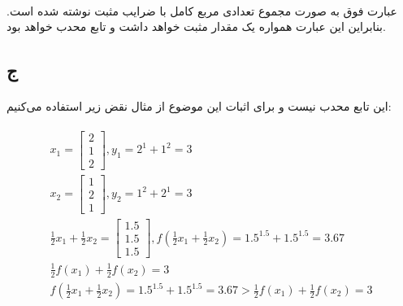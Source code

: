 \documentclass[paper=a4, fontsize=11pt]{article}
\numberwithin{equation}{section} %
\numberwithin{figure}{section} %
\numberwithin{table}{section} %
\begin{document}
\paragraph{}
عبارت فوق به صورت مجموع تعدادی مربع کامل با ضرایب مثبت نوشته شده است. بنابراین این عبارت
همواره یک مقدار مثبت خواهد داشت و تابع محدب خواهد بود.

\subsection{ج}
\paragraph{}
این تابع محدب نیست و برای اثبات این موضوع از مثال نقض زیر استفاده می‌کنیم:

\begin{align}
\begin{split}
	x_1 = \left[\begin{array}{c}
		2 \\ 1 \\ 2
	\end{array}\right],
	y_1 = 2^1 + 1^2 = 3
	\\
	x_2 = \left[\begin{array}{c}
		1 \\ 2 \\ 1
	\end{array}\right],
	y_2 = 1^2 + 2^1 = 3
	\\
	\frac{1}{2}x_1 + \frac{1}{2}x_2 =
	\left[\begin{array}{c}
		1.5 \\ 1.5 \\ 1.5
	\end{array}\right],
	f(\frac{1}{2}x_1 + \frac{1}{2}x_2) = 1.5^{1.5} + 1.5^{1.5} = 3.67
	\\
	\frac{1}{2}f(x_1) + \frac{1}{2}f(x_2) = 3
	\\
	f(\frac{1}{2}x_1 + \frac{1}{2}x_2) = 1.5^{1.5} + 1.5^{1.5} = 3.67
	>
	\frac{1}{2}f(x_1) + \frac{1}{2}f(x_2) = 3
\end{split}
\end{align}
\end{document}
